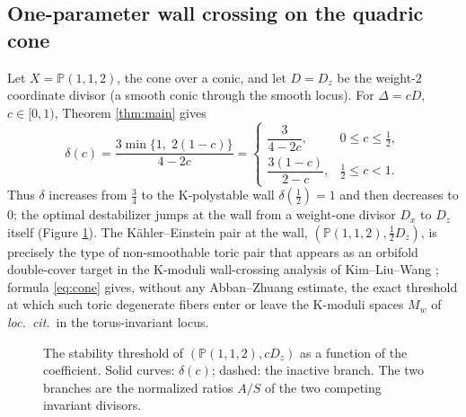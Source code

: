 \documentclass[11pt]{amsart}
\theoremstyle{definition}
\theoremstyle{remark}
\newcommand{\PP}{\mathbb{P}}
\begin{document}
\subsection{One-parameter wall crossing on the quadric cone}
\label{ss:quadriccone}
Let \(X=\PP(1,1,2)\), the cone over a conic, and let \(D=D_z\) be the
weight-\(2\) coordinate divisor (a smooth conic through the smooth
locus). For \(\Delta=cD\), \(c\in[0,1)\), Theorem \ref{thm:main} gives
\begin{equation}\label{eq:cone}
\delta(c)=\frac{3\min\{1,\;2(1-c)\}}{4-2c}
=\begin{cases}
\dfrac{3}{4-2c}, & 0\le c\le\tfrac12,\\[2ex]
\dfrac{3(1-c)}{2-c}, & \tfrac12\le c<1 .
\end{cases}
\end{equation}
Thus \(\delta\) increases from \(\tfrac34\) to the K-polystable wall
\(\delta(\tfrac12)=1\) and then decreases to \(0\); the optimal
destabilizer jumps at the wall from a weight-one divisor \(D_x\) to
\(D_z\) itself (Figure \ref{fig:wall}). The K\"ahler--Einstein pair at
the wall, \((\PP(1,1,2),\tfrac12D_z)\), is precisely the type of
non-smoothable toric pair that appears as an orbifold double-cover target
in the K-moduli wall-crossing analysis of Kim--Liu--Wang \cite{KLW24};
formula \eqref{eq:cone} gives, without any Abban--Zhuang estimate, the
exact threshold at which such toric degenerate fibers enter or leave the
K-moduli spaces \(M_w\) of \emph{loc.\ cit.}\ in the torus-invariant
locus.

\begin{figure}[ht]
\centering
{}
\caption{The stability threshold of \((\PP(1,1,2),cD_z)\) as a function
of the coefficient. Solid curves: \(\delta(c)\); dashed: the inactive
branch. The two branches are the normalized ratios \(A/S\) of the two
competing invariant divisors.}
\label{fig:wall}
\end{figure}
\end{document}
